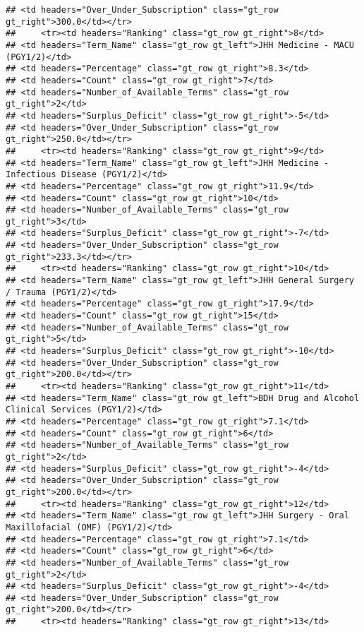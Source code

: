 \documentclass[
]{article}
\begin{document}
\begin{verbatim}
## <td headers="Over_Under_Subscription" class="gt_row gt_right">300.0</td></tr>
##     <tr><td headers="Ranking" class="gt_row gt_right">8</td>
## <td headers="Term_Name" class="gt_row gt_left">JHH Medicine - MACU (PGY1/2)</td>
## <td headers="Percentage" class="gt_row gt_right">8.3</td>
## <td headers="Count" class="gt_row gt_right">7</td>
## <td headers="Number_of_Available_Terms" class="gt_row gt_right">2</td>
## <td headers="Surplus_Deficit" class="gt_row gt_right">-5</td>
## <td headers="Over_Under_Subscription" class="gt_row gt_right">250.0</td></tr>
##     <tr><td headers="Ranking" class="gt_row gt_right">9</td>
## <td headers="Term_Name" class="gt_row gt_left">JHH Medicine - Infectious Disease (PGY1/2)</td>
## <td headers="Percentage" class="gt_row gt_right">11.9</td>
## <td headers="Count" class="gt_row gt_right">10</td>
## <td headers="Number_of_Available_Terms" class="gt_row gt_right">3</td>
## <td headers="Surplus_Deficit" class="gt_row gt_right">-7</td>
## <td headers="Over_Under_Subscription" class="gt_row gt_right">233.3</td></tr>
##     <tr><td headers="Ranking" class="gt_row gt_right">10</td>
## <td headers="Term_Name" class="gt_row gt_left">JHH General Surgery / Trauma (PGY1/2)</td>
## <td headers="Percentage" class="gt_row gt_right">17.9</td>
## <td headers="Count" class="gt_row gt_right">15</td>
## <td headers="Number_of_Available_Terms" class="gt_row gt_right">5</td>
## <td headers="Surplus_Deficit" class="gt_row gt_right">-10</td>
## <td headers="Over_Under_Subscription" class="gt_row gt_right">200.0</td></tr>
##     <tr><td headers="Ranking" class="gt_row gt_right">11</td>
## <td headers="Term_Name" class="gt_row gt_left">BDH Drug and Alcohol Clinical Services (PGY1/2)</td>
## <td headers="Percentage" class="gt_row gt_right">7.1</td>
## <td headers="Count" class="gt_row gt_right">6</td>
## <td headers="Number_of_Available_Terms" class="gt_row gt_right">2</td>
## <td headers="Surplus_Deficit" class="gt_row gt_right">-4</td>
## <td headers="Over_Under_Subscription" class="gt_row gt_right">200.0</td></tr>
##     <tr><td headers="Ranking" class="gt_row gt_right">12</td>
## <td headers="Term_Name" class="gt_row gt_left">JHH Surgery - Oral Maxillofacial (OMF) (PGY1/2)</td>
## <td headers="Percentage" class="gt_row gt_right">7.1</td>
## <td headers="Count" class="gt_row gt_right">6</td>
## <td headers="Number_of_Available_Terms" class="gt_row gt_right">2</td>
## <td headers="Surplus_Deficit" class="gt_row gt_right">-4</td>
## <td headers="Over_Under_Subscription" class="gt_row gt_right">200.0</td></tr>
##     <tr><td headers="Ranking" class="gt_row gt_right">13</td>

\end{verbatim}
\end{document}

